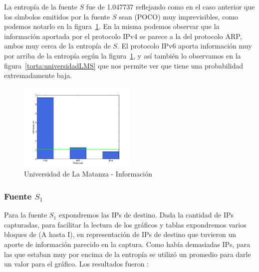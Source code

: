 \documentclass[final,inline,narroweqnarray,a4paper]{ieee}
\begin{document}
La entropía de la fuente $S$ fue de 1.047737 reflejando como en el caso anterior que los símbolos emitidos por la fuente $S$ sean (POCO) muy imprevisibles, como podemos notarlo en la figura~\ref{histo:universidadLMS}. En la misma podemos observar que la información aportada por el protocolo IPv4 se parece a la del protocolo ARP, ambos muy cerca de la entropía de $S$. El protocolo IPv6 aporta información muy por arriba de la entropía según la figura~\ref{histo:universidadLMS}, y así también lo observamos en la figura~\ref{torta:universidadLMS} que nos permite ver que tiene una probabilidad extremadamente baja.

\begin{figure}[H]
    \begin{center}
        \includegraphics[width=0.5\textwidth]{plot/facultadS-bar.png}
        \caption{Universidad de La Matanza - Información}
        \label{histo:universidadLMS}
    \end{center}
\end{figure}

\subsubsection{Fuente $S_1$}

Para la fuente $S_1$ expondremos las IPs de destino. Dada la cantidad de IPs capturadas, para facilitar la lectura de los gráficos y tablas expondremos varios bloques de (A hasta I), en representación de IPs de destino que tuvieron un aporte de información parecido en la captura. Como había demasiadas IPs, para las que estaban muy por encima de la entropía se utilizó un promedio para darle un valor para el gráfico. Los resultados fueron :
\end{document}
